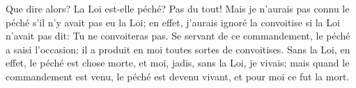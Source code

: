 Que dire alors? La Loi est-elle péché?
	Pas du tout!
Mais je n’aurais pas connu le péché s’il n’y avait pas eu la Loi;
	en effet, j’aurais ignoré la convoitise si la Loi n’avait pas dit:
	Tu ne convoiteras pas.
Se servant de ce commandement, le péché a saisi l’occasion:
	il a produit en moi toutes sortes de convoitises.
Sans la Loi, en effet, le péché est chose morte,
	et moi, jadis, sans la Loi, je vivais;
	mais quand le commandement est venu, le péché est devenu vivant,
	et pour moi ce fut la mort.
